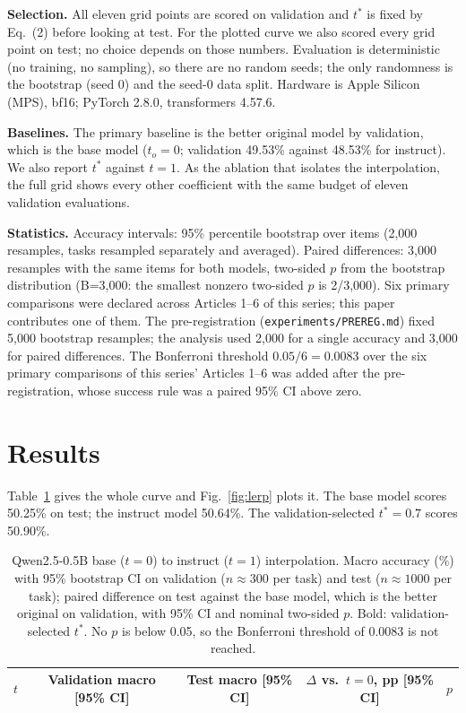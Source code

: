 \documentclass[conference]{IEEEtran}
\begin{document}
\textbf{Selection.} All eleven grid points are scored on validation and $t^\ast$ is fixed by Eq.~(2) before looking at test. For the plotted curve we also scored every grid point on test; no choice depends on those numbers. Evaluation is deterministic (no training, no sampling), so there are no random seeds; the only randomness is the bootstrap (seed 0) and the seed-0 data split. Hardware is Apple Silicon (MPS), bf16; PyTorch 2.8.0, transformers 4.57.6.

\textbf{Baselines.} The primary baseline is the better original model by validation, which is the base model ($t_o=0$; validation 49.53\% against 48.53\% for instruct). We also report $t^\ast$ against $t=1$. As the ablation that isolates the interpolation, the full grid shows every other coefficient with the same budget of eleven validation evaluations.

\textbf{Statistics.} Accuracy intervals: 95\% percentile bootstrap \cite{efron1979bootstrap} over items (2{,}000 resamples, tasks resampled separately and averaged). Paired differences: 3{,}000 resamples with the same items for both models, two-sided $p$ from the bootstrap distribution (B=3,000: the smallest nonzero two-sided $p$ is 2/3,000). Six primary comparisons were declared across Articles 1--6 of this series; this paper contributes one of them. The pre-registration (\texttt{experiments/PREREG.md}) fixed 5,000 bootstrap resamples; the analysis used 2,000 for a single accuracy and 3,000 for paired differences. The Bonferroni threshold $0.05/6=0.0083$ over the six primary comparisons of this series' Articles 1--6 was added after the pre-registration, whose success rule was a paired 95\% CI above zero.

\section{Results}
Table~\ref{tab:lerp} gives the whole curve and Fig.~\ref{fig:lerp} plots it. The base model scores 50.25\% on test; the instruct model 50.64\%. The validation-selected $t^\ast=0.7$ scores 50.90\%.

\begin{table}[!t]
\caption{Qwen2.5-0.5B base ($t=0$) to instruct ($t=1$) interpolation. Macro accuracy (\%) with 95\% bootstrap CI on validation ($n\approx300$ per task) and test ($n\approx1000$ per task); paired difference on test against the base model, which is the better original on validation, with 95\% CI and nominal two-sided $p$. Bold: validation-selected $t^\ast$. No $p$ is below 0.05, so the Bonferroni threshold of 0.0083 is not reached.}
\label{tab:lerp}
\centering
\small
\begin{tabular}{lcccc}
\toprule
$t$ & Validation macro [95\% CI] & Test macro [95\% CI] & $\Delta$ vs.\ $t=0$, pp [95\% CI] & $p$ \\
\midrule

\end{tabular}
\end{table}
\end{document}
